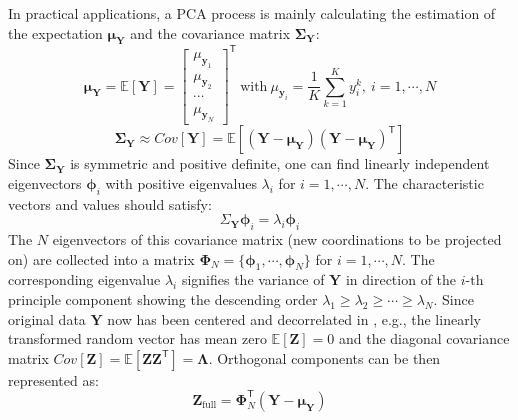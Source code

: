 \documentclass{tufte-handout}
\begin{document}
In practical applications, a PCA process is mainly calculating the estimation of the expectation $\boldsymbol{\mu_{Y}}$ and the covariance matrix $\boldsymbol{\Sigma_{Y}}$:
\begin{equation}
\label{eq: PCA-mu}
\boldsymbol{\mu_{Y}} = \mathbb{E}[\boldsymbol{Y}]
= \begin{bmatrix}
\mu_{\boldsymbol{y}_{1}} \\
\mu_{\boldsymbol{y}_{2}} \\
\cdots \\
\mu_{\boldsymbol{y}_{N}}
\end{bmatrix}^{\mathsf{T} }
\ 
\text{with}
\
\mu_{\boldsymbol{y}_{i}} = \frac{1}{K} \sum_{k=1}^{K} y_{i}^{k}
,\
i=1,\cdots,N
\end{equation}
\begin{equation}  
\label{eq: PCA-sigma}
\boldsymbol{\Sigma_{Y}} \approx Cov[\boldsymbol{Y}] 
 = \mathbb{E}[
(\boldsymbol{Y} -\boldsymbol{\mu_{Y}} )
(\boldsymbol{Y} - \boldsymbol{\mu_{Y}} )^{\mathsf{T}}
] 
\end{equation}
Since $\boldsymbol{\Sigma_{Y}}$ is symmetric and positive definite, one can find linearly independent eigenvectors $\boldsymbol{\phi}_{i}$ with positive eigenvalues $\lambda_{i}$ for $i=1,\cdots,N$. The characteristic vectors and values should satisfy:
\begin{equation}  
\label{eq: PCA-decompostion}
\Sigma_{\boldsymbol{Y}}\boldsymbol{\phi}_{i}
=
\lambda_{i}\boldsymbol{\phi}_{i}
\end{equation}
The $N$ eigenvectors of this covariance matrix (new coordinations to be projected on) are collected into a matrix $\boldsymbol{\Phi}_{N} = \{\boldsymbol{\phi}_{1},\cdots,\boldsymbol{\phi}_{N}\}$ for $i=1,\cdots,N$. The corresponding eigenvalue $\lambda_{i}$ signifies the variance of $\boldsymbol{Y}$ in direction of the $i \text{-th}$ principle component showing the descending order $\lambda_{1}\ge \lambda_{2} \ge \cdots \ge \lambda_{N}$. Since original data $\boldsymbol{Y}$ now has been centered and decorrelated in , e.g., the linearly transformed random vector has mean zero $\mathbb{E}[\boldsymbol{Z}] = 0$ and the diagonal covariance matrix $Cov[\boldsymbol{Z}] =\mathbb{E}[\boldsymbol{Z}\boldsymbol{Z}^{\mathsf{T}}] = \boldsymbol{\Lambda}$. Orthogonal components can be then represented as:
\begin{equation}  
\boldsymbol{Z}_{\text{full}} = \boldsymbol{\Phi}_{N}^{\mathsf{T}}
(\boldsymbol{Y} - \boldsymbol{\mu_{Y}})
\end{equation}
\end{document}
